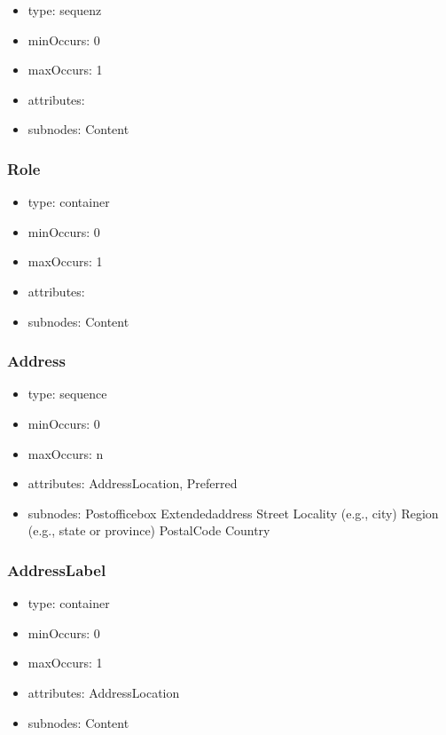 \documentclass[a4paper,11pt]{article}
\begin{document}
\begin{itemize}
  \item type: sequenz
  \item minOccurs: 0
  \item maxOccurs: 1
  \item attributes:
  \item subnodes:
  \subitem Content
\end{itemize}

\subsubsection{Role}
\begin{itemize}
  \item type: container
  \item minOccurs: 0
  \item maxOccurs: 1
  \item attributes:
  \item subnodes:
  \subitem Content
\end{itemize}

\subsubsection{Address}
\begin{itemize}
  \item type: sequence
  \item minOccurs: 0
  \item maxOccurs: n
  \item attributes: AddressLocation, Preferred
  \item subnodes:
  \subitem Postofficebox
  \subitem Extendedaddress
  \subitem Street
  \subitem Locality (e.g., city)
  \subitem Region (e.g., state or province)
  \subitem PostalCode
  \subitem Country
\end{itemize}

\subsubsection{AddressLabel}
\begin{itemize}
  \item type: container
  \item minOccurs: 0
  \item maxOccurs: 1
  \item attributes: AddressLocation
  \item subnodes:
  \subitem Content
\end{itemize}
\end{document}
